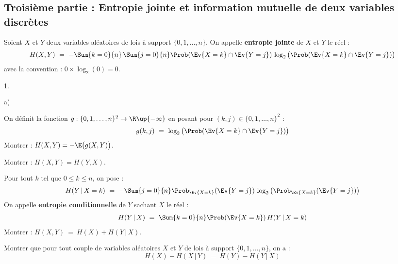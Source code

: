 \documentclass[11pt]{article}%
\begin{document}
\subsection*{Troisième partie : Entropie jointe et information
  mutuelle de deux variables discrètes}

\noindent
Soient $X$ et $Y$ deux variables aléatoires de lois à support $\{0,1,
\ldots, n\}$. On appelle {\bf entropie jointe} de $X$ et $Y$ le réel :
\[
  H(X,Y) \ = \ - \Sum{k=0}{n} \, \Sum{j=0}{n} \Prob(\Ev{X = k} \cap
  \Ev{Y = j}) \, \log_2 \big( \Prob(\Ev{X = k} \cap \Ev{Y = j}) \big)
\]
avec la convention : $0 \times \log_2(0) = 0$.
\begin{noliste}{1.}
  \setlength{\itemsep}{4mm}
  \setcounter{enumi}{10}
\item
  \begin{noliste}{a)}
    \setlength{\itemsep}{2mm}
  \item On définit la fonction $g : \{0,1, \ldots , n \}^2 \to \R \up
    \{-\infty\}$ en posant pour $(k,j) \in \{0,1, \ldots, n\}^2$ :
    \[
      g(k,j) \ = \ \log_2 \big( \Prob(\Ev{X = k} \cap \Ev{Y = j})\big)
    \]
    Montrer : $H(X,Y) = -\E\big( g(X,Y) \big)$.
    
  \item Montrer : $H(X,Y) = H(Y,X)$.
    
  \item Pour tout $k$ tel que $0 \leq k \leq n$, on pose :
    \[
      H(Y \, | \, X = k) \ = \ -\Sum{j=0}{n} \Prob_{\Ev{X = k}} (\Ev{Y
        = j}) \, \log_2 \left( \Prob_{\Ev{X = k}}(\Ev{Y = j}) \right)
    \]
    On appelle {\bf entropie conditionnelle} de $Y$ sachant $X$ le
    réel :
    \[
      H(Y \, | \, X) \ = \ \Sum{k=0}{n} \Prob(\Ev{X = k}) \, H(Y \, |
      \, X = k)
    \]
    Montrer : $H(X,Y) \ = \ H(X) + H(Y \, | \, X)$.
    
  \item Montrer que pour tout couple de variables aléatoires $X$ et
    $Y$ de lois à support $\{0,1, \ldots ,n\}$, on a :
    \[
      H(X) - H(X \, | \, Y) \ = \ H(Y) - H(Y \, | \, X)
    \]
  \end{noliste}
  

\end{noliste}
\end{document}
